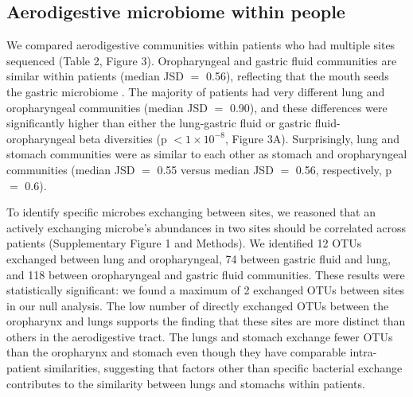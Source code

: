 \documentclass{article}
\begin{document}


\subsection{Aerodigestive microbiome within people}

We compared aerodigestive communities within patients who had multiple sites sequenced (Table 2, Figure 3).
Oropharyngeal and gastric fluid communities are similar within patients (median JSD $=$ 0.56), reflecting that the mouth seeds the gastric microbiome \cite{Bassis2015source,Charlson2011topographical}.
The majority of patients had very different lung and oropharyngeal communities (median JSD $=$ 0.90), and these differences were significantly higher than either the lung-gastric fluid or gastric fluid-oropharyngeal beta diversities (p $< 1 \times 10^{-8}$, Figure 3A).
Surprisingly, lung and stomach communities were as similar to each other as stomach and oropharyngeal communities (median JSD $=$ 0.55 versus median JSD $=$ 0.56, respectively, p $=$ 0.6).

To identify specific microbes exchanging between sites, we reasoned that an actively exchanging microbe's abundances in two sites should be correlated across patients (Supplementary Figure 1 and Methods). 
We identified 12 OTUs exchanged between lung and oropharyngeal, 74 between gastric fluid and lung, and 118 between oropharyngeal and gastric fluid communities.
These results were statistically significant: we found a maximum of 2 exchanged OTUs between sites in our null analysis.
The low number of directly exchanged OTUs between the oropharynx and lungs supports the finding that these sites are more distinct than others in the aerodigestive tract.
The lungs and stomach exchange fewer OTUs than the oropharynx and stomach even though they have comparable intra-patient similarities, suggesting that factors other than specific bacterial exchange contributes to the similarity between lungs and stomachs within patients.
\end{document}

